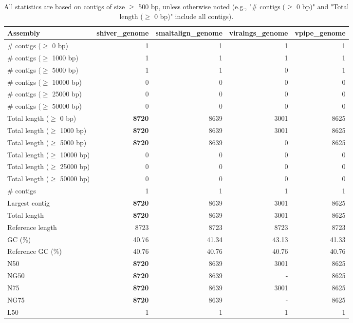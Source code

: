 \documentclass[12pt,a4paper]{article}
\begin{document}
\begin{table}[ht]
\begin{center}
\caption{All statistics are based on contigs of size $\geq$ 500 bp, unless otherwise noted (e.g., "\# contigs ($\geq$ 0 bp)" and "Total length ($\geq$ 0 bp)" include all contigs).}
\begin{tabular}{|l*{4}{|r}|}
\hline
Assembly & shiver\_genome & smaltalign\_genome & viralngs\_genome & vpipe\_genome \\ \hline
\# contigs ($\geq$ 0 bp) & 1 & 1 & 1 & 1 \\ \hline
\# contigs ($\geq$ 1000 bp) & 1 & 1 & 1 & 1 \\ \hline
\# contigs ($\geq$ 5000 bp) & 1 & 1 & 0 & 1 \\ \hline
\# contigs ($\geq$ 10000 bp) & 0 & 0 & 0 & 0 \\ \hline
\# contigs ($\geq$ 25000 bp) & 0 & 0 & 0 & 0 \\ \hline
\# contigs ($\geq$ 50000 bp) & 0 & 0 & 0 & 0 \\ \hline
Total length ($\geq$ 0 bp) & {\bf 8720} & 8639 & 3001 & 8625 \\ \hline
Total length ($\geq$ 1000 bp) & {\bf 8720} & 8639 & 3001 & 8625 \\ \hline
Total length ($\geq$ 5000 bp) & {\bf 8720} & 8639 & 0 & 8625 \\ \hline
Total length ($\geq$ 10000 bp) & 0 & 0 & 0 & 0 \\ \hline
Total length ($\geq$ 25000 bp) & 0 & 0 & 0 & 0 \\ \hline
Total length ($\geq$ 50000 bp) & 0 & 0 & 0 & 0 \\ \hline
\# contigs & 1 & 1 & 1 & 1 \\ \hline
Largest contig & {\bf 8720} & 8639 & 3001 & 8625 \\ \hline
Total length & {\bf 8720} & 8639 & 3001 & 8625 \\ \hline
Reference length & 8723 & 8723 & 8723 & 8723 \\ \hline
GC (\%) & 40.76 & 41.34 & 43.13 & 41.33 \\ \hline
Reference GC (\%) & 40.76 & 40.76 & 40.76 & 40.76 \\ \hline
N50 & {\bf 8720} & 8639 & 3001 & 8625 \\ \hline
NG50 & {\bf 8720} & 8639 & - & 8625 \\ \hline
N75 & {\bf 8720} & 8639 & 3001 & 8625 \\ \hline
NG75 & {\bf 8720} & 8639 & - & 8625 \\ \hline
L50 & 1 & 1 & 1 & 1 \\ \hline

\end{tabular}
\end{center}
\end{table}
\end{document}
